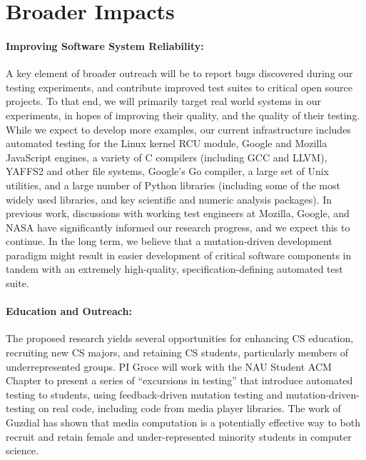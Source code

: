 \section{Broader Impacts}

\paragraph{Improving Software System Reliability:} A key element of
broader outreach will be to report bugs discovered during our testing
experiments, and contribute improved test suites to critical open
source projects.  To that end, we will primarily target real world
systems in our experiments, in hopes of improving their quality, and
the quality of their testing.  While we expect to develop more
examples, our current infrastructure includes automated testing for
the Linux kernel RCU module, Google and Mozilla JavaScript engines, a
variety of C compilers (including GCC and LLVM), YAFFS2 \cite{yaffs2}
and other file systems, Google's Go compiler, a large set of Unix
utilities, and a large number of Python libraries (including some of
the most widely used libraries, and key scientific and numeric
analysis packages).  In previous work, discussions with working test
engineers at Mozilla, Google, and NASA have significantly informed our
research progress, and we expect this to continue.  In the long term,
we believe that a mutation-driven development paradigm might result in
easier development of critical software components in tandem with an
extremely high-quality, specification-defining automated test suite.

\paragraph{Education and Outreach:}
The proposed research yields several opportunities for enhancing CS
education, recruiting new CS majors, and retaining CS students,
particularly members of underrepresented groups.  
PI Groce will work with the NAU Student ACM Chapter to present a
series of ``excursions in testing'' that introduce automated testing
to students, using feedback-driven mutation testing  and
mutation-driven-testing on real code, including code from
media player libraries.  The work of Guzdial
\cite{Guzdial} has shown that media computation is a
potentially effective way to both recruit and retain female and
under-represented minority students in computer science.
